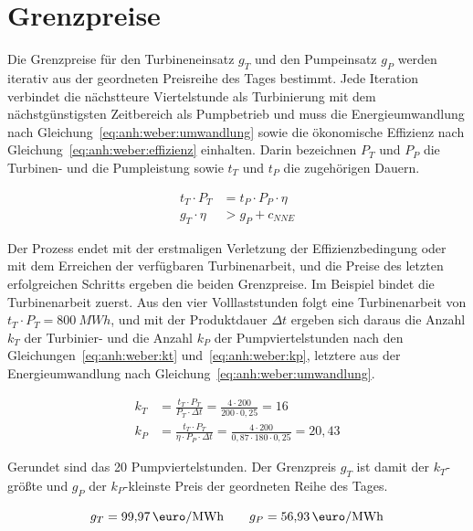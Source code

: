 \section{Grenzpreise}
\label{anh:weber:grenzpreis}

Die Grenzpreise für den Turbineneinsatz $g_T$ und den Pumpeinsatz $g_P$ werden iterativ aus der geordneten Preisreihe des Tages bestimmt. Jede Iteration verbindet die nächstteure Viertelstunde als Turbinierung mit dem nächstgünstigsten Zeitbereich als Pumpbetrieb und muss die Energieumwandlung nach Gleichung~\eqref{eq:anh:weber:umwandlung} sowie die ökonomische Effizienz nach Gleichung~\eqref{eq:anh:weber:effizienz} einhalten. Darin bezeichnen $P_T$ und $P_P$ die Turbinen- und die Pumpleistung sowie $t_T$ und $t_P$ die zugehörigen Dauern.

\begin{align}
  t_T \cdot P_T &= t_P \cdot P_P \cdot \eta \label{eq:anh:weber:umwandlung}\\
  g_T \cdot \eta &> g_P + c_{NNE} \label{eq:anh:weber:effizienz}
\end{align}

Der Prozess endet mit der erstmaligen Verletzung der Effizienzbedingung oder mit dem Erreichen der verfügbaren Turbinenarbeit, und die Preise des letzten erfolgreichen Schritts ergeben die beiden Grenzpreise. Im Beispiel bindet die Turbinenarbeit zuerst. Aus den vier Volllaststunden folgt eine Turbinenarbeit von $t_T \cdot P_T = \SI{800}{MWh}$, und mit der Produktdauer $\Delta t$ ergeben sich daraus die Anzahl $k_T$ der Turbinier- und die Anzahl $k_P$ der Pumpviertelstunden nach den Gleichungen~\eqref{eq:anh:weber:kt} und~\eqref{eq:anh:weber:kp}, letztere aus der Energieumwandlung nach Gleichung~\eqref{eq:anh:weber:umwandlung}.

\begin{align}
  k_T &= \frac{t_T \cdot P_T}{P_T \cdot \Delta t} = \frac{4 \cdot 200}{200 \cdot 0{,}25} = 16 \label{eq:anh:weber:kt}\\
  k_P &= \frac{t_T \cdot P_T}{\eta \cdot P_P \cdot \Delta t} = \frac{4 \cdot 200}{0{,}87 \cdot 180 \cdot 0{,}25} = 20{,}43 \label{eq:anh:weber:kp}
\end{align}

Gerundet sind das 20 Pumpviertelstunden. Der Grenzpreis $g_T$ ist damit der $k_T$-größte und $g_P$ der $k_P$-kleinste Preis der geordneten Reihe des Tages.

\begin{equation}
  g_T = 99{,}97\,\si{\text{\euro}\per MWh}
  \qquad
  g_P = 56{,}93\,\si{\text{\euro}\per MWh}
  \label{eq:anh:weber:beispiel:grenzpreise}
\end{equation}


